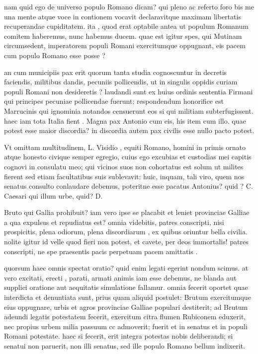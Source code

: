  nam quid ego de universo populo Romano dicam? qui pleno ac referto foro bis me una mente atque voce in contionem vocavit declaravitque maximam libertatis recuperandae cupiditatem. ita , quod erat optabile antea ut populum Romanum comitem haberemus, nunc habemus ducem. quae est igitur spes, qui Mutinam circumsedent, imperatorem populi Romani exercitumque oppugnant, eis pacem cum populo Romano esse posse ?

 an cum municipiis pax erit quorum tanta studia cognoscuntur in decretis faciendis, militibus dandis, pecuniis pollicendis, ut in singulis oppidis curiam populi Romani non desideretis ? laudandi sunt ex huius ordinis sententia Firmani qui principes pecuniae pollicendae fuerunt; respondendum honorifice est Marrucinis qui ignominia notandos censuerunt eos si qui militiam subterfugissent. haec iam tota Italia fient . Magna pax Antonio cum eis, his item cum illo. quae potest esse maior discordia? in discordia autem pax civilis esse nullo pacto potest.

 Vt omittam multitudinem, L. Visidio , equiti Romano, homini in primis ornato atque honesto civique semper egregio, cuius ego excubias et custodias mei capitis cognovi in consulatu meo; qui vicinos suos non cohortatus est solum ut milites fierent sed etiam facultatibus suis sublevavit: huic, inquam, tali viro, quem nos senatus consulto conlaudare debemus, poteritne esse pacatus Antonius? quid ? C. Caesari qui illum urbe, quid? D.

 Bruto qui Gallia prohibuit? iam vero ipse se placabit et leniet provinciae Galliae a qua expulsus et repudiatus est? omnia videbitis, patres conscripti, nisi prospicitis, plena odiorum, plena discordiarum , ex quibus oriuntur bella civilia. nolite igitur id velle quod fieri non potest, et cavete, per deos immortalis! patres conscripti, ne spe praesentis pacis perpetuam pacem amittatis .

 quorsum haec omnis spectat oratio? quid enim legati egerint nondum scimus. at vero excitati, erecti , parati, armati animis iam esse debemus, ne blanda aut supplici oratione aut aequitatis simulatione fallamur. omnia fecerit oportet quae interdicta et denuntiata sunt, prius quam aliquid postulet: Brutum exercitumque eius oppugnare, urbis et agros provinciae Galliae populari destiterit; ad Brutum adeundi legatis potestatem fecerit, exercitum citra flumen Rubiconem eduxerit, nec propius urbem milia passuum cc admoverit; fuerit et in senatus et in populi Romani potestate. haec si fecerit, erit integra potestas nobis deliberandi; si senatui non paruerit, non illi senatus, sed ille populo Romano bellum indixerit.

